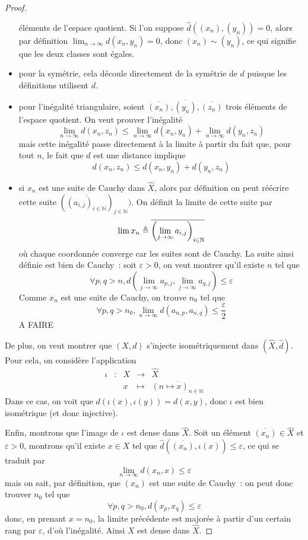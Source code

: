 \begin{proof}
\begin{itemize}
    éléments de l'espace quotient. Si l'on suppose $\hat d((x_n),(y_n)) = 0$,
    alors par définition $\displaystyle\lim_{n\to\infty} d(x_n,y_n) = 0$, donc
    $(x_n)\sim (y_n)$, ce qui
    signifie que les deux classes sont égales.
  \item pour la symétrie, cela découle directement de la symétrie de $d$ puisque
    les définitions utilisent $d$.
  \item pour l'inégalité triangulaire, soient
    $\overline{(x_n)},\overline{(y_n)},\overline{(z_n)}$ trois éléments de
    l'espace quotient. On veut prouver l'inégalité
    \[\lim_{n\to\infty} d(x_n,z_n) \leq \lim_{n\to\infty} d(x_n,y_n) +
    \lim_{n\to\infty} d(y_n,z_n)\]
    mais cette inégalité passe directement à la limite à partir du fait que,
    pour tout $n$, le fait que $d$ est une distance implique
    \[d(x_n,z_n) \leq d(x_n,y_n) + d(y_n,z_n)\]
  \item si $x_n$ est une suite de Cauchy dans $\hat X$, alors par définition on
    peut réécrire cette suite
    $(\overline{(a_{i,j})_{i \in \mathbb N}})_{j \in \mathbb N})$. On
    définit la limite de cette suite par
    \[\lim x_n \triangleq \overline{\left(
    \lim_{j \to \infty} a_{i,j}\right)_{i \in \mathbb N}}\]
    où chaque coordonnée converge car les suites sont de Cauchy. La suite ainsi
    définie est bien de Cauchy~: soit $\varepsilon > 0$, on veut montrer qu'il
    existe $n$ tel que
    \[\forall p,q > n, d(\lim_{j\to\infty}a_{p,j},\lim_{j\to\infty} a_{q,j})
    \leq\varepsilon\]
    Comme $x_n$ est une
    suite de Cauchy, on trouve $n_0$ tel que
    \[\forall p,q > n_0, \lim_{n\to\infty} d(a_{n,p},a_{n,q})
    \leq\frac{\varepsilon}{2}\]
    A FAIRE
  \end{itemize}
  De plus, on veut montrer que $(X,d)$ s'injecte isométriquement dans
  $(\hat X,\hat d)$. Pour cela, on considère l'application
  \[\begin{array}{ccccc}
  \iota & : & X & \longrightarrow & \hat X\\
  & & x & \longmapsto & \overline{(n \mapsto x)_{n\in \mathbb N}}
  \end{array}\]
  Dans ce cas, on voit que $d(\iota(x),\iota(y)) = d(x,y)$, donc $\iota$ est
  bien isométrique (et donc injective).

  Enfin, montrons que l'image de $\iota$ est dense dans $\hat X$. Soit un
  élément $\overline{(x_n)}\in\hat X$ et $\varepsilon > 0$, montrons qu'il
  existe $x\in X$ tel que $\hat d(\overline{(x_n)},\iota(x)) \leq\varepsilon$,
  ce qui se traduit par
  \[\lim_{n\to\infty} d(x_n,x) \leq \varepsilon\]
  mais on sait, par définition, que $(x_n)$ est une suite de Cauchy~: on peut
  donc trouver $n_0$ tel que
  \[\forall p,q > n_0, d(x_p,x_q) \leq\varepsilon\]
  donc, en prenant $x = n_0$, la limite précédente est majorée à partir d'un
  certain rang par $\varepsilon$, d'où l'inégalité. Ainsi $X$ est dense dans
  $\hat X$.
\end{proof}

